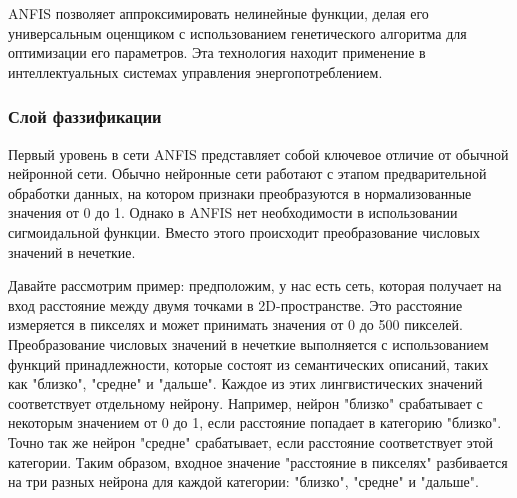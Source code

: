 ANFIS позволяет аппроксимировать нелинейные функции, делая его универсальным оценщиком с использованием генетического алгоритма для оптимизации его параметров. Эта технология находит применение в интеллектуальных системах управления энергопотреблением.

\subsubsection{Слой фаззификации}
Первый уровень в сети ANFIS представляет собой ключевое отличие от обычной нейронной сети. Обычно нейронные сети работают с этапом предварительной обработки данных, на котором признаки преобразуются в нормализованные значения от 0 до 1. Однако в ANFIS нет необходимости в использовании сигмоидальной функции. Вместо этого происходит преобразование числовых значений в нечеткие.

Давайте рассмотрим пример: предположим, у нас есть сеть, которая получает на вход расстояние между двумя точками в 2D-пространстве. Это расстояние измеряется в пикселях и может принимать значения от 0 до 500 пикселей. Преобразование числовых значений в нечеткие выполняется с использованием функций принадлежности, которые состоят из семантических описаний, таких как "близко", "средне" и "дальше". Каждое из этих лингвистических значений соответствует отдельному нейрону. Например, нейрон "близко" срабатывает с некоторым значением от 0 до 1, если расстояние попадает в категорию "близко". Точно так же нейрон "средне" срабатывает, если расстояние соответствует этой категории. Таким образом, входное значение "расстояние в пикселях" разбивается на три разных нейрона для каждой категории: "близко", "средне" и "дальше".
